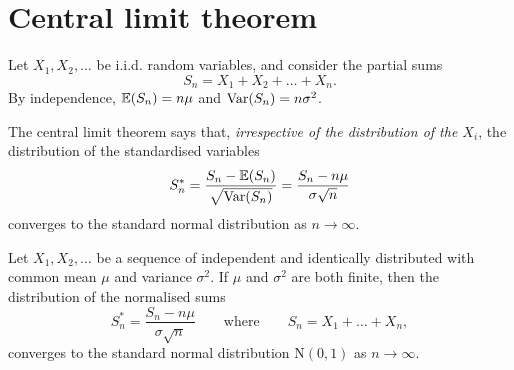 \section{Central limit theorem}
Let $X_1,X_2,\ldots$ be i.i.d. random variables, and consider the partial sums
\[
S_n = X_1 + X_2 + \ldots + X_n.
\]
By independence, $\mathbb{E}(S_n)=n\mu$ and $\text{Var}(S_n)=n\sigma^2$.

\bigskip
The central limit theorem says that, \emph{irrespective of the distribution of the $X_i$}, the distribution of the standardised variables
\[
S^{*}_n = \frac{S_n-\mathbb{E}(S_n)}{\sqrt{\text{Var}(S_n)}} = \frac{S_n - n\mu}{\sigma\sqrt{n}}
\]
converges to the standard normal distribution as $n\to\infty$.

\begin{theorem}
Let $X_1,X_2,\ldots$ be a sequence of independent and identically distributed with common mean $\mu$ and variance $\sigma^2$. If $\mu$ and $\sigma^2$ are both finite, then the distribution of the normalised sums
\[
S^{*}_n = \frac{S_n - n\mu}{\sigma\sqrt{n}}\qquad\text{where}\qquad S_n=X_1+\ldots+X_n,
\]
converges to the standard normal distribution $\text{N}(0,1)$ as $n\to\infty$.
\end{theorem}

